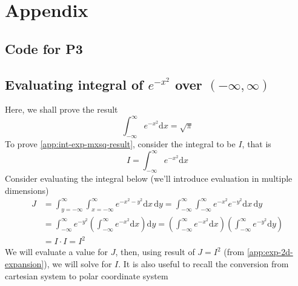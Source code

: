 \documentclass[main.tex]{article}
\begin{document}
    \section{Appendix}

    \subsection{Code for P3}
    \label{app:code-p3}
    

    \pagebreak
    \subsection[Evaluating \texorpdfstring{$\int_{-\infty}^{\infty} e^{-x^2} \mathrm{d}x$}{Integral(exp(-x**2))}]{Evaluating integral of \texorpdfstring{$e^{-x^2}$}{exp(-x^2)} over \texorpdfstring{$\left (-\infty, \infty \right )$}{all real numbers}}
    \label{app:proof-int-exp-mxsq}
    Here, we shall prove the result
    \begin{equation}
        \label{app:int-exp-mxsq-result}
        \int_{-\infty}^{\infty} e^{-x^2} \mathrm{d}x = \sqrt{\pi}
    \end{equation}
    To prove \ref{app:int-exp-mxsq-result}, consider the integral to be $I$, that is
    \begin{equation}
        I = \int_{-\infty}^{\infty} e^{-x^2} \mathrm{d}x
    \end{equation}
    Consider evaluating the integral below (we'll introduce evaluation in multiple dimensions)
    \begin{equation}
        \begin{split}
            J & = \int_{y=-\infty}^{\infty} \int_{x=-\infty}^{\infty} e^{-x^2-y^2} \mathrm{d}x \, \mathrm{d}y
            = \int_{-\infty}^{\infty} \int_{-\infty}^{\infty} e^{-x^2} e^{-y^2} \mathrm{d}x \, \mathrm{d}y \\
            & = \int_{-\infty}^{\infty} e^{-y^2} \left ( \int_{-\infty}^{\infty} e^{-x^2} \mathrm{d}x \right ) \mathrm{d}y
            = \left ( \int_{-\infty}^{\infty} e^{-x^2} \mathrm{d}x \right ) \left ( \int_{-\infty}^{\infty} e^{-y^2} \mathrm{d}y  \right ) \\
            & = I \cdot I = I^2
        \end{split}
        \label{app:exp-2d-expansion}
    \end{equation}
    We will evaluate a value for $J$, then, using result of $J = I^2$ (from \ref{app:exp-2d-expansion}), we will solve for $I$. It is also useful to recall the conversion from cartesian system to polar coordinate system
\end{document}
